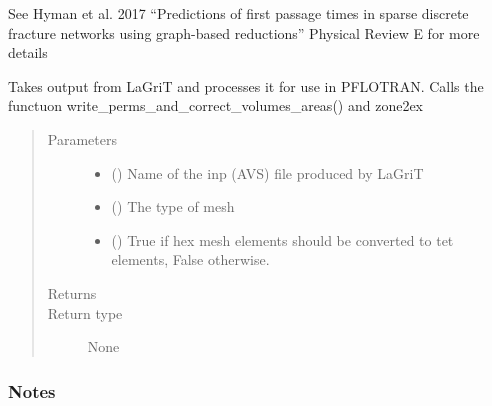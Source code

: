\documentclass[letterpaper,10pt,english]{sphinxmanual}
\begin{document}
\begin{fulllineitems}
\begin{fulllineitems}
See Hyman et al. 2017 “Predictions of first passage times in sparse discrete fracture networks using graph-based reductions” Physical Review E for more details

\end{fulllineitems}


\begin{fulllineitems}
\label{\detokenize{pydfnworks:pydfnworks.general.dfnworks.DFNWORKS.lagrit2pflotran}}
Takes output from LaGriT and processes it for use in PFLOTRAN.
Calls the functuon write\_perms\_and\_correct\_volumes\_areas() and zone2ex
\begin{quote}\begin{description}
\item[{Parameters}] \leavevmode\begin{itemize}
\item {} 
 () \textendash{} Name of the inp (AVS) file produced by LaGriT

\item {} 
 () \textendash{} The type of mesh

\item {} 
 () \textendash{} True if hex mesh elements should be converted to tet elements, False otherwise.

\end{itemize}

\item[{Returns}] \leavevmode


\item[{Return type}] \leavevmode
None

\end{description}\end{quote}
\subsubsection*{Notes}


\end{fulllineitems}
\end{fulllineitems}
\end{document}
